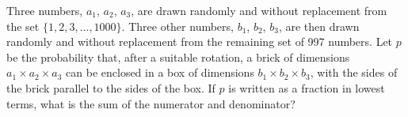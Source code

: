 Three numbers, $a_1$, $a_2$, $a_3$, are drawn randomly and without replacement from the set $\{1, 2, 3, \dots, 1000\}$.  Three other numbers, $b_1$, $b_2$, $b_3$, are then drawn randomly and without replacement from the remaining set of 997 numbers.  Let $p$ be the probability that, after a suitable rotation, a brick of dimensions $a_1 \times a_2 \times a_3$ can be enclosed in a box of dimensions $b_1 \times b_2 \times b_3$, with the sides of the brick parallel to the sides of the box.  If $p$ is written as a fraction in lowest terms, what is the sum of the numerator and denominator?